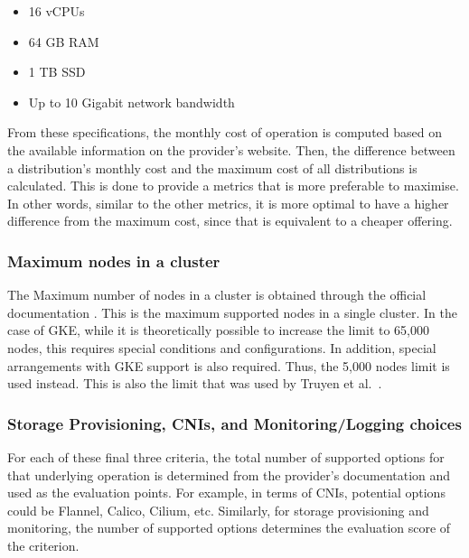 \begin{itemize}
\tightlist
\item
  16 vCPUs
\item
  64 GB RAM
\item
  1 TB SSD
\item
  Up to 10 Gigabit network bandwidth
\end{itemize}

From these specifications, the monthly cost of operation is computed
based on the available information on the provider's website. Then, the difference between a distribution's monthly cost and the maximum cost of all distributions is calculated. This is done to provide a metrics that is more preferable to maximise. In other words, similar to the other metrics, it is more optimal to have a higher difference from the maximum cost, since that is equivalent to a cheaper offering.

\subsubsection{Maximum nodes in a cluster}\label{maximum-nodes-in-a-cluster}

The Maximum number of nodes in a cluster is obtained through the
official documentation
\cite{Chapter4Planninga,KnownLimitsService,nickomangLimitsResourcesSKUs2024,QuotasLimitsGoogle}.
This is the maximum supported nodes in a single cluster. In the case of
GKE, while it is theoretically possible to increase the limit to 65,000
nodes, this requires special conditions and configurations. In addition,
special arrangements with GKE support is also required. Thus, the 5,000
nodes limit is used instead. This is also the limit that was used by
Truyen et al.~\cite{truyenManagingFeatureCompatibility2020}.

\subsubsection{Storage Provisioning, CNIs, and Monitoring/Logging choices}\label{storage-provisioning-cnis-and-monitoring-and-logging}

For each of these final three criteria, the total number of supported options for that
underlying operation is determined from the provider's documentation and used as the evaluation points. For example, in terms of CNIs, potential options could be Flannel, Calico, Cilium, etc. Similarly, for storage provisioning and monitoring, the number of supported options determines the evaluation score of the criterion.

